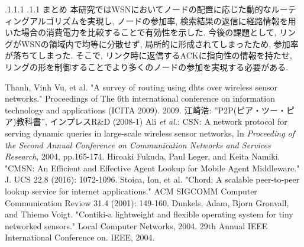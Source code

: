 \documentclass[a4paper, twocolumn]{jarticle}
\makeatletter
\def\section{\@startsection{section}{1}{\z@}%
 {.1\Cvs \@plus.1\Cdp \@minus.1\Cdp}%
 {.1\Cvs \@plus.1\Cdp}%
 {\normalfont\normalsize\bfseries}}
\makeatother
\begin{document}
\section{まとめ}
本研究ではWSNにおいてノードの配置に応じた動的なルーティングアルゴリズムを実現し,
ノードの参加率, 検索結果の返信に経路情報を用いた場合の消費電力を比較することで有効性を示した.
今後の課題として, リングがWSNの領域内で均等に分散せず, 局所的に形成されてしまったため, 参加率が落ちてしまった.
そこで, リンク時に返信するACKに指向性の情報を持たせ, リングの形を制御することでより多くのノードの参加を実現する必要がある. 
\begin{thebibliography}{9}
{\small
Thanh, Vinh Vu, et al. "A survey of routing using dhts over wireless sensor networks." Proceedings of The 6th international conference on information technology and applications (ICITA 2009). 2009.
江崎浩: ''P2P(ピア・ツー・ピア)教科書'', インプレスR\&D (2008-1)
Ali {\em et al.}: CSN: A network protocol for serving dynamic queries in large-scale wireless sensor networks, In {\em Proceeding of the Second Annual Conference on Communication Networks and Services Research}, 2004, pp.165-174.
Hiroaki Fukuda, Paul Leger, and Keita Namiki. "CMSN: An Efficient and Effective Agent Lookup for Mobile Agent Middleware." J. UCS 22.8 (2016): 1072-1096.
Stoica, Ion, et al. "Chord: A scalable peer-to-peer lookup service for internet applications." ACM SIGCOMM Computer Communication Review 31.4 (2001): 149-160.
Dunkels, Adam, Bjorn Gronvall, and Thiemo Voigt. "Contiki-a lightweight and flexible operating system for tiny networked sensors." Local Computer Networks, 2004. 29th Annual IEEE International Conference on. IEEE, 2004.
}
\end{thebibliography}
\end{document}
